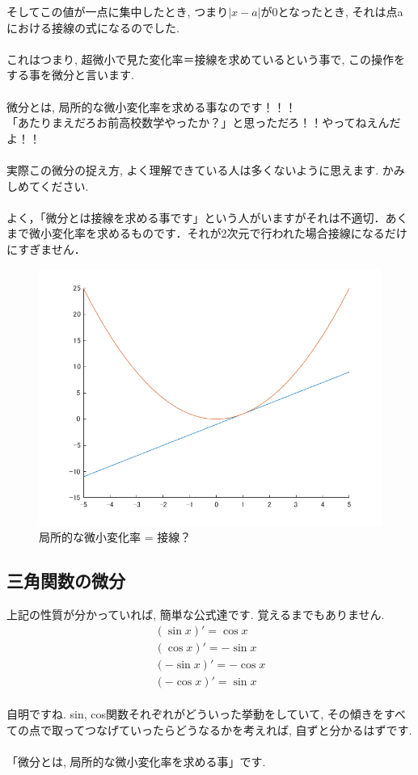 \documentclass[11pt,a4paper]{jreport}
\begin{document}
そしてこの値が一点に集中したとき, つまり$|x-a|$が0となったとき, それは点aにおける接線の式になるのでした.\\
\\
これはつまり, 超微小で見た変化率＝接線を求めているという事で, この操作をする事を微分と言います.\\
\\
微分とは, 局所的な微小変化率を求める事なのです！！！\\
「あたりまえだろお前高校数学やったか？」と思っただろ！！やってねえんだよ！！\\
\\
実際この微分の捉え方, よく理解できている人は多くないように思えます. かみしめてください.\\
\\
よく，「微分とは接線を求める事です」という人がいますがそれは不適切．あくまで微小変化率を求めるものです．それが2次元で行われた場合接線になるだけにすぎません．

\begin{figure}[H]
\label{im:sessen}
  \centering
  \includegraphics[width=120mm,bb=0 0 700 525]{figures/sessen.png}
  \caption{局所的な微小変化率 = 接線？}
\end{figure}

\subsection{三角関数の微分}
上記の性質が分かっていれば, 簡単な公式達です. 覚えるまでもありません.
\begin{eqnarray}
(\sin x)' = \cos x \\
(\cos x)' = -\sin x \\
(-\sin x)' = -\cos x \\
(-\cos x)' = \sin x
\end{eqnarray}
\\
自明ですね. sin, cos関数それぞれがどういった挙動をしていて, その傾きをすべての点で取ってつなげていったらどうなるかを考えれば, 自ずと分かるはずです.\\
\\
「微分とは, 局所的な微小変化率を求める事」です.\\
\end{document}
